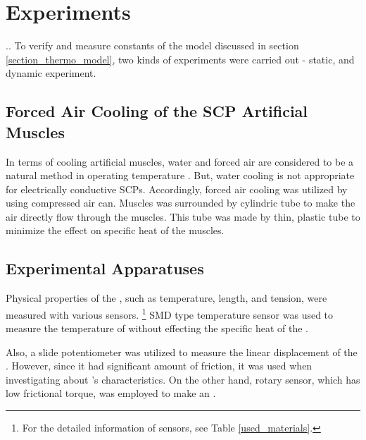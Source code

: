 
\section{Experiments}\label{section_experiments}


.. To verify and measure constants of the model discussed in section \ref{section_thermo_model}, two kinds of experiments were carried out - static, and dynamic experiment.


\subsection{Forced Air Cooling of the SCP Artificial Muscles}\label{section_electrical_control}

In terms of cooling artificial muscles, water and forced air are considered to be a natural method in operating temperature \cite{madden}.
But, water cooling is not appropriate for electrically conductive SCPs. Accordingly, forced air cooling was utilized by using compressed air can.
Muscles was surrounded by cylindric tube to make the air directly flow through the muscles.
This tube was made by thin, plastic tube to minimize the effect on specific heat of the muscles.


\subsection{Experimental Apparatuses} \label{section_appa}

Physical properties of the \scpsnospace, such as temperature, length, and tension, were measured with various sensors.
\footnote{For the detailed information of sensors, see Table \ref{used_materials}.}
SMD type temperature sensor was used to measure the temperature of \scps without effecting the specific heat of the \scpnospace.

Also, a slide potentiometer was utilized to measure the linear displacement of the \scpsnospace. However, since it had significant amount of friction, it was used when investigating about \scpnospace's characteristics. On the other hand, rotary sensor, which has low frictional torque, was employed to make an \antanospace. 

